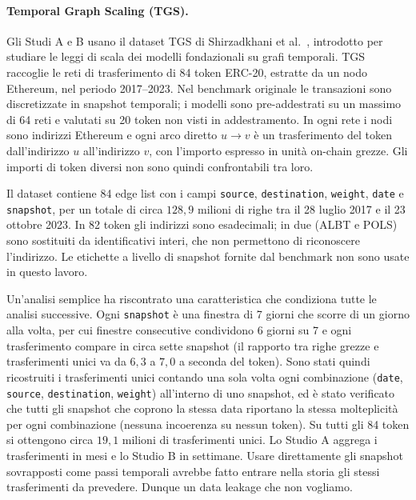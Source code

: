 \documentclass[11pt]{article}
\begin{document}
\paragraph{Temporal Graph Scaling (TGS).}
Gli Studi A e B usano il dataset TGS di Shirzadkhani et al.\
\cite{shirzadkhani2024tgs}, introdotto per studiare le leggi di scala dei
modelli fondazionali su grafi temporali. TGS raccoglie le reti di
trasferimento di 84 token ERC-20, estratte da un nodo Ethereum, nel periodo
2017--2023. Nel benchmark originale le transazioni sono discretizzate in
snapshot temporali; i modelli sono pre-addestrati su un massimo di 64 reti e
valutati su 20 token non visti in addestramento. In ogni rete i nodi sono
indirizzi Ethereum e ogni arco diretto $u \to v$ è un trasferimento del token
dall'indirizzo $u$ all'indirizzo $v$, con l'importo espresso in unità
on-chain grezze. Gli importi di token diversi non sono quindi confrontabili
tra loro.

Il dataset contiene 84 edge list con i campi \texttt{source},
\texttt{destination}, \texttt{weight}, \texttt{date} e \texttt{snapshot}, per
un totale di circa $128{,}9$ milioni di righe tra il 28 luglio 2017 e il 23
ottobre 2023. In 82 token gli indirizzi sono esadecimali; in due (ALBT e POLS)
sono sostituiti da identificativi interi, che non permettono di riconoscere
l'indirizzo. Le etichette a livello di snapshot fornite dal benchmark non sono usate in questo lavoro.

Un'analisi semplice ha riscontrato una caratteristica che condiziona tutte
le analisi successive. Ogni \texttt{snapshot} è una finestra di 7 giorni che
scorre di un giorno alla volta, per cui finestre consecutive condividono 6
giorni su 7 e ogni trasferimento compare in circa sette snapshot (il rapporto
tra righe grezze e trasferimenti unici va da $6{,}3$ a $7{,}0$ a seconda del
token). Sono stati quindi ricostruiti i trasferimenti unici contando una sola
volta ogni combinazione (\texttt{date}, \texttt{source},
\texttt{destination}, \texttt{weight}) all'interno di uno snapshot, ed è stato
verificato che tutti gli snapshot che coprono la stessa data riportano la
stessa molteplicità per ogni combinazione (nessuna incoerenza su nessun
token). Su tutti gli 84 token si ottengono circa $19{,}1$ milioni di
trasferimenti unici. Lo Studio A aggrega i trasferimenti in mesi e lo Studio B in settimane. Usare direttamente gli snapshot sovrapposti come passi temporali
avrebbe fatto entrare nella storia gli stessi trasferimenti da prevedere. Dunque un data leakage che non vogliamo.
\end{document}
